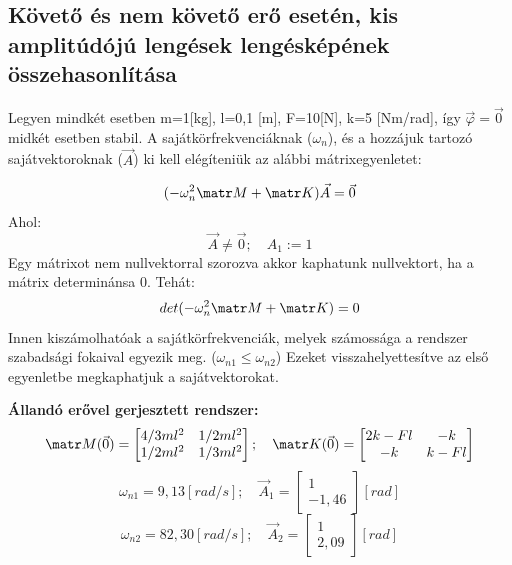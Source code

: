 \documentclass[12pt,twoside]{article}
\begin{document}
\subsection{Követő és nem követő erő esetén, kis amplitúdójú lengések lengésképének összehasonlítása}%
Legyen mindkét esetben m=1[kg], l=0,1 [m], F=10[N], k=5 [Nm/rad], így $\vec\varphi= \vec0$ midkét esetben stabil.\newline
A sajátkörfrekvenciáknak ($\omega_n$), és a hozzájuk tartozó sajátvektoroknak ($\vec A$) ki kell elégíteniük az alábbi mátrixegyenletet:

\begin{equation} \label{eq:Newton}
(-\omega_n^2 \matr M+\matr K) \vec A=\vec 0
\end{equation}
Ahol:
\begin{equation} \label{eq:Newton}
\vec A\neq \vec0; \quad A_1:=1
\end{equation}
Egy mátrixot nem nullvektorral szorozva akkor kaphatunk nullvektort, ha a mátrix determinánsa 0. Tehát:
\begin{equation} \label{eq:Newton}
det(-\omega_n^2 \matr M+\matr K)= 0
\end{equation}
Innen kiszámolhatóak a sajátkörfrekvenciák, melyek számossága a rendszer szabadsági fokaival egyezik meg. ($\omega_{n1} \leq \omega_{n2}$) Ezeket visszahelyettesítve az első egyenletbe megkaphatjuk a sajátvektorokat.\newline

\textbf{Állandó erővel gerjesztett rendszer:}
\begin{equation} \label{eq:Newton}
\matr M(\vec 0)=
\begin{bmatrix}
4/3 ml^2 & 1/2 ml^2 \\
1/2 ml^2 & 1/3 ml^2
\end{bmatrix}; \quad
\matr K(\vec0) =
\begin{bmatrix}
2k-Fl & -k \\
-k & k-Fl
\end{bmatrix}
\end{equation}
\begin{equation} \label{eq:Newton}
\omega_{n1}=9,13 [rad/s];\quad
\vec A_1=
\begin{bmatrix}
1 \\
-1,46
\end{bmatrix}[rad]
\end{equation}
\begin{equation} \label{eq:Newton}
\omega_{n2}=82,30 [rad/s];\quad
\vec A_2=
\begin{bmatrix}
1 \\
2,09
\end{bmatrix}[rad]
\end{equation}
\end{document}
